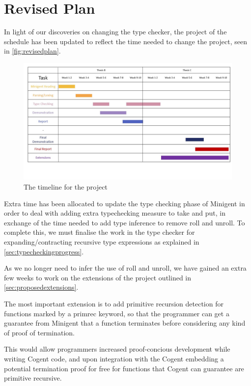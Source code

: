 \chapter{Revised Plan}\label{ch:plan}

In light of our discoveries  on changing the type checker,
the project of the schedule has been updated to reflect the time needed to change the project,
seen in \autoref{fig:revisedplan}.

\begin{figure}
    \centering
    \includegraphics[height=0.50\textheight, angle=90]{content/revised_plan.jpg}
    \caption{The timeline for the project}
    \label{fig:revisedplan}
\end{figure}

Extra time has been allocated to update the type checking phase of Minigent in order to deal with
adding extra typechecking measure to \textsf{take} and \textsf{put}, in exchange of the time
needed to add type inference to remove \textsf{roll} and \textsf{unroll}. To complete this,
we must finalise the work in the type checker for expanding/contracting recursive type expressions
as explained in \autoref{sec:typecheckingprogress}.

As we no longer need to infer the use of \textsf{roll} and \textsf{unroll}, we have gained an extra
few weeks to work on the extensions of the project outlined in \autoref{sec:proposedextensions}.

The most important extension is to add primitive recursion detection for functions marked by
a \textsf{primrec} keyword, so that the programmer can get a guarantee from Minigent that
a function terminates before considering any kind of proof of termination.

This would allow programmers increased proof-concious development while writing Cogent code,
and upon integration with the Cogent embedding a potential termination proof for free for
functions that Cogent can guarantee are primitive recursive.

